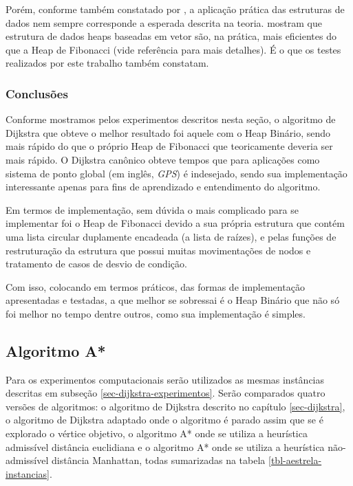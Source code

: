Porém, conforme também constatado por , a aplicação prática das estruturas de dados nem sempre corresponde a esperada descrita na teoria.  mostram que estrutura de dados heaps baseadas em vetor são, na prática, mais eficientes do que a Heap de Fibonacci (vide referência para mais detalhes). É o que os testes realizados por este trabalho também constatam.

\subsubsection{Conclusões}
\label{sec-dijkstra-conclusoes}
Conforme mostramos pelos experimentos descritos nesta seção, o algoritmo de Dijkstra que obteve o melhor resultado foi aquele com o Heap Binário, sendo mais rápido do que o próprio Heap de Fibonacci que teoricamente deveria ser mais rápido. O Dijkstra canônico obteve tempos que para aplicações como sistema de ponto global (em inglês, \textit{GPS}) é indesejado, sendo sua implementação interessante apenas para fins de aprendizado e entendimento do algoritmo.

Em termos de implementação, sem dúvida o mais complicado para se implementar foi o Heap de Fibonacci devido a sua própria estrutura que contém uma lista circular duplamente encadeada (a lista de raízes), e pelas funções de restruturação da estrutura que possui muitas movimentações de nodos e tratamento de casos de desvio de condição.

Com isso, colocando em termos práticos, das formas de implementação apresentadas e testadas, a que melhor se sobressai é o Heap Binário que não só foi melhor no tempo dentre outros, como sua implementação é simples.

\subsection{Algoritmo A*}
\label{sec-aestrela-experimentos}

Para os experimentos computacionais serão utilizados as mesmas instâncias descritas em subseção \ref{sec-dijkstra-experimentos}. Serão comparados quatro versões de algoritmos: o algoritmo de Dijkstra descrito no capítulo \ref{sec-dijkstra}, o algoritmo de Dijkstra adaptado onde o algoritmo é parado assim que se é explorado o vértice objetivo, o algoritmo A* onde se utiliza a heurística admissível distância euclidiana e o algoritmo A* onde se utiliza a heurística não-admissível distância Manhattan, todas sumarizadas na tabela \ref{tbl-aestrela-instancias}.

